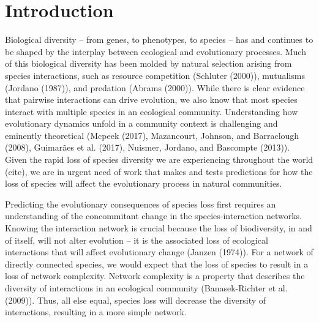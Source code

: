 \documentclass[]{elsarticle} %
\begin{document}
\section{Introduction}\label{introduction}

Biological diversity -- from genes, to phenotypes, to species -- has and
continues to be shaped by the interplay between ecological and
evolutionary processes. Much of this biological diversity has been
molded by natural selection arising from species interactions, such as
resource competition (Schluter (2000)), mutualisms (Jordano (1987)), and
predation (Abrams (2000)). While there is clear evidence that pairwise
interactions can drive evolution, we also know that most species
interact with multiple species in an ecological community. Understanding
how evolutionary dynamics unfold in a community context is challenging
and eminently theoretical (Mcpeek (2017), Mazancourt, Johnson, and
Barraclough (2008), Guimarães et al. (2017), Nuismer, Jordano, and
Bascompte (2013)). Given the rapid loss of species diversity we are
experiencing throughout the world (cite), we are in urgent need of work
that makes and tests predictions for how the loss of species will affect
the evolutionary process in natural communities.

Predicting the evolutionary consequences of species loss first requires
an understanding of the concommitant change in the species-interaction
networks. Knowing the interaction network is crucial because the loss of
biodiversity, in and of itself, will not alter evolution -- it is the
associated loss of ecological interactions that will affect evolutionary
change (Janzen (1974)). For a network of directly connected species, we
would expect that the loss of species to result in a loss of network
complexity. Network complexity is a property that describes the
diversity of interactions in an ecological community (Banasek-Richter et
al. (2009)). Thus, all else equal, species loss will decrease the
diversity of interactions, resulting in a more simple network.
\end{document}
